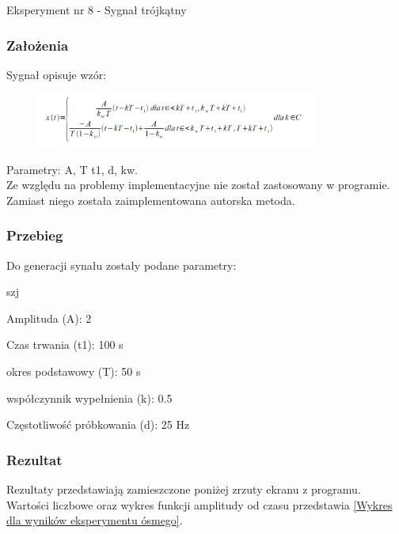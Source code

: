 \documentclass[12pt]{article}
\begin{document}
Eksperyment nr 8 - Sygnał trójkątny

\subsubsection{Założenia}
Sygnał opisuje wzór:
\begin{figure}[h!]
 \centering
 \includegraphics[width=9.3cm]{TrojWzor.PNG}
 \vspace{-0.3cm}
 \label{gw}
\end{figure}
\newpage
Parametry: A, T t1, d, kw.
\\Ze względu na problemy implementacyjne nie został zastosowany w programie. Zamiast niego została zaimplementowana autorska metoda.
\subsubsection{Przebieg}
Do generacji synału zostały podane parametry:

\begin{labeling}{szj}
\item [Amplituda (A):] 2
\item [Czas trwania (t1):] 100 s
\item [okres podstawowy (T):] 50 s
\item [współczynnik wypełnienia (k):] 0.5
\item [Częstotliwość próbkowania (d): ] 25 Hz
\end{labeling}

\subsubsection{Rezultat}
Rezultaty przedstawiają zamieszczone poniżej zrzuty ekranu z programu. Wartości liczbowe oraz wykres funkcji amplitudy od czasu przedstawia \ref{Wykres dla wyników eksperymentu ósmego}.
\end{document}
